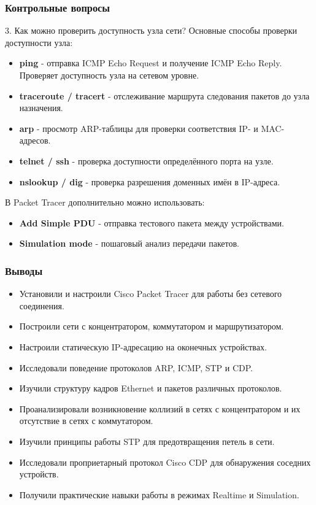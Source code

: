 \begin{frame}
\frametitle{Контрольные вопросы}

\begin{block}{3. Как можно проверить доступность узла сети?}
Основные способы проверки доступности узла:

\begin{itemize}
\item \textbf{ping} - отправка ICMP Echo Request и получение ICMP Echo Reply. Проверяет доступность узла на сетевом уровне.
\item \textbf{traceroute / tracert} - отслеживание маршрута следования пакетов до узла назначения.
\item \textbf{arp} - просмотр ARP-таблицы для проверки соответствия IP- и MAC-адресов.
\item \textbf{telnet / ssh} - проверка доступности определённого порта на узле.
\item \textbf{nslookup / dig} - проверка разрешения доменных имён в IP-адреса.
\end{itemize}

В Packet Tracer дополнительно можно использовать:
\begin{itemize}
\item \textbf{Add Simple PDU} - отправка тестового пакета между устройствами.
\item \textbf{Simulation mode} - пошаговый анализ передачи пакетов.
\end{itemize}
\end{block}
\end{frame}

\begin{frame}
\frametitle{Выводы}
\begin{itemize}
    \item Установили и настроили Cisco Packet Tracer для работы без сетевого соединения.
    \item Построили сети с концентратором, коммутатором и маршрутизатором.
    \item Настроили статическую IP-адресацию на оконечных устройствах.
    \item Исследовали поведение протоколов ARP, ICMP, STP и CDP.
    \item Изучили структуру кадров Ethernet и пакетов различных протоколов.
    \item Проанализировали возникновение коллизий в сетях с концентратором и их отсутствие в сетях с коммутатором.
    \item Изучили принципы работы STP для предотвращения петель в сети.
    \item Исследовали проприетарный протокол Cisco CDP для обнаружения соседних устройств.
    \item Получили практические навыки работы в режимах Realtime и Simulation.
\end{itemize}
\end{frame}


